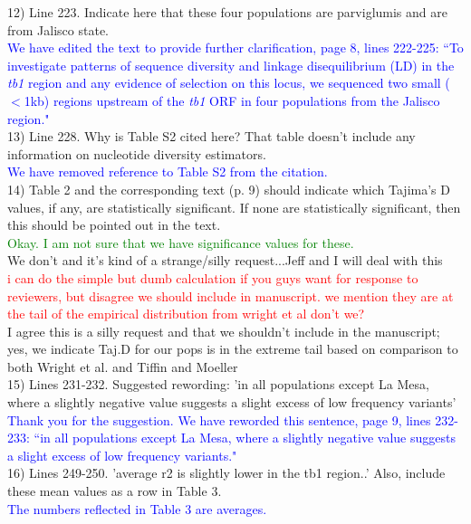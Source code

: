 \documentclass[11pt]{article}
\newcommand{\res}[1]{\noindent \textcolor{blue}{{#1}} \\}
\newcommand{\jri}[1]{\noindent \textcolor{red}{{#1}} \\}
\newcommand{\lev}[1]{\noindent \textcolor{green}{{#1}} \\}
\newcommand{\mbh}[1]{\noindent \textcolor{Dandelion}{{#1}}\\}
\begin{document}
12) Line 223. Indicate here that these four populations are parviglumis and are from Jalisco state. \\

\res{We have edited the text to provide further clarification, page 8, lines 222-225: ``To investigate patterns of sequence diversity and linkage disequilibrium (LD) in the \emph{tb1} region and any evidence of selection on this locus, we sequenced two small ($<$1kb) regions upstream of the \emph{tb1} ORF in four populations from the Jalisco region."}

13) Line 228. Why is Table S2 cited here? That table doesn't include any information on nucleotide diversity estimators.\\

\res{We have removed reference to Table S2 from the citation.}

14) Table 2 and the corresponding text (p. 9) should indicate which Tajima's D values, if any, are statistically significant. If none are statistically significant, then this should be pointed out in the text. \\

\lev{Okay. I am not sure that we have significance values for these.}

\mbh{We don't and it's kind of a strange/silly request...Jeff and I will deal with this}
\jri{ i can do the simple but dumb calculation if you guys want for response to reviewers, but disagree we should include in manuscript. we mention they are at the tail of the empirical distribution from wright et al don't we?}
\mbh{I agree this is a silly request and that we shouldn't include in the manuscript; yes, we indicate Taj.D for our pops is in the extreme tail based on comparison to both Wright et al. and Tiffin and Moeller}

15) Lines 231-232. Suggested rewording: 'in all populations except La Mesa, where a slightly negative value suggests a slight excess of low frequency variants'\\

\res{Thank you for the suggestion. We have reworded this sentence, page 9, lines 232-233: ``in all populations except La Mesa, where a slightly negative value suggests a slight excess of low frequency variants."}

16) Lines 249-250. 'average r2 is slightly lower in the tb1 region..' Also, include these mean values as a row in Table 3.\\

\res{The numbers reflected in Table 3 are averages.}
\end{document}
